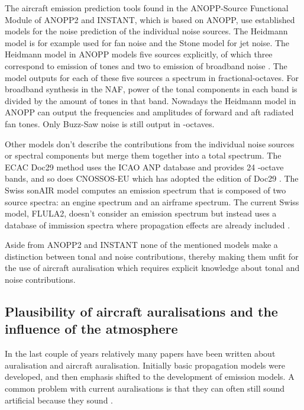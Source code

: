 The aircraft emission prediction tools found in the ANOPP-Source Functional
Module of ANOPP2 \cite{Lopes2016, Tuttle2017} and INSTANT\cite{Sahai2016b}, which is based
on ANOPP, use established models for the noise prediction of the individual
noise sources. The Heidmann model is for example used for fan noise and the
Stone model for jet noise. The Heidmann model in ANOPP models
five sources explicitly, of which three correspond to emission of tones and two
to emission of broadband noise \cite{Arntzen2014a}. The model outputs for each
of these five sources a spectrum in fractional-octaves.
For broadband synthesis in the NAF\cite{Aumann2015}, power of the tonal
components in each band is divided by the amount of tones in that band.
Nowadays the Heidmann model in ANOPP can output the frequencies and amplitudes
of forward and aft radiated fan tones. Only Buzz-Saw noise is still output in
-octaves.


Other models don't describe the contributions from the individual noise
sources or spectral components but merge them together into a total spectrum.
The ECAC Doc29 method \cite{Doc29_fourth_2016} uses the ICAO ANP database and
provides 24 -octave bands, and so does CNOSSOS-EU which has
adopted the  edition of Doc29 \cite{Doc29_third_2005}. The Swiss sonAIR
model \cite{Zellmann2016} computes an emission spectrum that is composed of two
source spectra: an engine spectrum and an airframe spectrum. The current Swiss
model, FLULA2, doesn't consider an emission spectrum but instead uses a database
of immission spectra where propagation effects are already included
\cite{EMPA2010,Schaffer2014}.

Aside from ANOPP2 and INSTANT none of the mentioned models make a distinction
between tonal and noise contributions, thereby making them unfit for the use of
aircraft auralisation which requires explicit knowledge about tonal and noise
contributions.

\subsection*{Plausibility of aircraft auralisations and the influence of the atmosphere}
In the last couple of years relatively many papers have been written about
auralisation and aircraft auralisation. Initially basic propagation models were
developed, and then emphasis shifted to the development of emission models. A
common problem with current auralisations is that they can often still sound
artificial because they sound .


